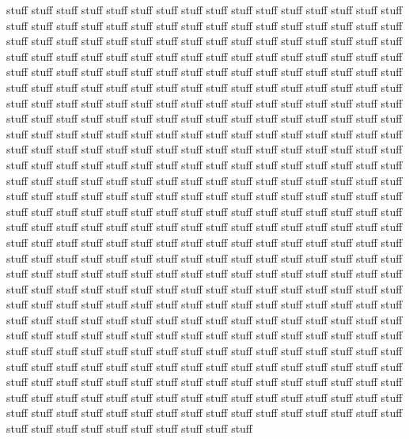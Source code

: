 \documentclass[dissertation]{bsu-cs}  %
\begin{document}
stuff stuff stuff stuff stuff stuff stuff stuff stuff stuff stuff stuff stuff
stuff stuff stuff stuff stuff stuff stuff stuff stuff stuff stuff stuff stuff
stuff stuff stuff stuff stuff stuff stuff stuff stuff stuff stuff stuff stuff
stuff stuff stuff stuff stuff stuff stuff stuff stuff stuff stuff stuff stuff
stuff stuff stuff stuff stuff stuff stuff stuff stuff stuff stuff stuff stuff
stuff stuff stuff stuff stuff stuff stuff stuff stuff stuff stuff stuff stuff
stuff stuff stuff stuff stuff stuff stuff stuff stuff stuff stuff stuff stuff
stuff stuff stuff stuff stuff stuff stuff stuff stuff stuff stuff stuff stuff
stuff stuff stuff stuff stuff stuff stuff stuff stuff stuff stuff stuff stuff
stuff stuff stuff stuff stuff stuff stuff stuff stuff stuff stuff stuff stuff
stuff stuff stuff stuff stuff stuff stuff stuff stuff stuff stuff stuff stuff
stuff stuff stuff stuff stuff stuff stuff stuff stuff stuff stuff stuff stuff
stuff stuff stuff stuff stuff stuff stuff stuff stuff stuff stuff stuff stuff
stuff stuff stuff stuff stuff stuff stuff stuff stuff stuff stuff stuff stuff
stuff stuff stuff stuff stuff stuff stuff stuff stuff stuff stuff stuff stuff
stuff stuff stuff stuff stuff stuff stuff stuff stuff stuff stuff stuff stuff
stuff stuff stuff stuff stuff stuff stuff stuff stuff stuff stuff stuff stuff
stuff stuff stuff stuff stuff stuff stuff stuff stuff stuff stuff stuff stuff
stuff stuff stuff stuff stuff stuff stuff stuff stuff stuff stuff stuff stuff
stuff stuff stuff stuff stuff stuff stuff stuff stuff stuff stuff stuff stuff
stuff stuff stuff stuff stuff stuff stuff stuff stuff stuff stuff stuff stuff
stuff stuff stuff stuff stuff stuff stuff stuff stuff stuff stuff stuff stuff
stuff stuff stuff stuff stuff stuff stuff stuff stuff stuff stuff stuff stuff
stuff stuff stuff stuff stuff stuff stuff stuff stuff stuff stuff stuff stuff
stuff stuff stuff stuff stuff stuff stuff stuff stuff stuff stuff stuff stuff
stuff stuff stuff stuff stuff stuff stuff stuff stuff stuff stuff stuff stuff
stuff stuff stuff stuff stuff stuff stuff stuff stuff stuff stuff stuff stuff
stuff stuff stuff stuff stuff stuff stuff stuff stuff stuff stuff stuff stuff
stuff stuff stuff stuff stuff stuff stuff stuff stuff stuff stuff stuff stuff
stuff stuff stuff stuff stuff stuff stuff stuff stuff stuff stuff stuff stuff
stuff stuff stuff stuff stuff stuff stuff stuff stuff stuff stuff stuff stuff
stuff stuff stuff stuff stuff stuff stuff stuff stuff stuff stuff stuff stuff
stuff stuff stuff stuff stuff stuff stuff stuff stuff stuff stuff stuff stuff
stuff stuff stuff stuff stuff stuff stuff stuff stuff stuff stuff stuff stuff
\end{document}
